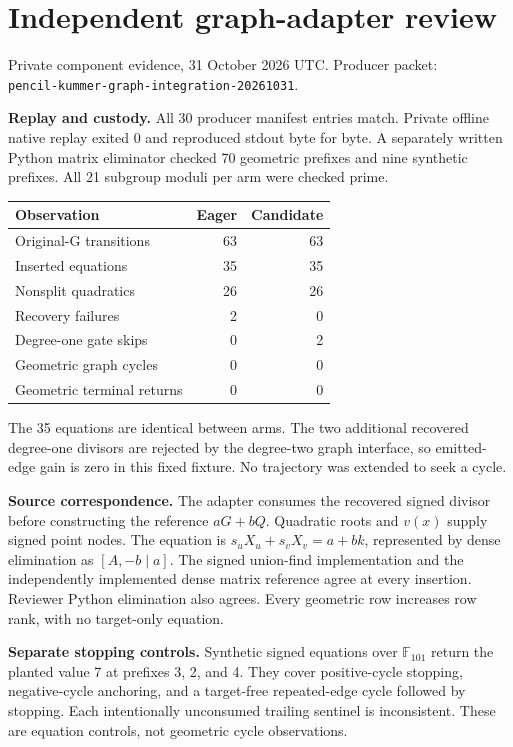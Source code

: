 \documentclass[11pt]{article}
\begin{document}
\section*{Independent graph-adapter review}
Private component evidence, 31 October 2026 UTC. Producer packet:\\ \texttt{pencil-kummer-graph-integration-20261031}.

\textbf{Replay and custody.} All 30 producer manifest entries match. Private offline native replay exited 0 and reproduced stdout byte for byte. A separately written Python matrix eliminator checked 70 geometric prefixes and nine synthetic prefixes. All 21 subgroup moduli per arm were checked prime.

\begin{center}\begin{tabular}{lrr}\toprule
Observation & Eager & Candidate\\\midrule
Original-G transitions &63&63\\
Inserted equations &35&35\\
Nonsplit quadratics &26&26\\
Recovery failures &2&0\\
Degree-one gate skips &0&2\\
Geometric graph cycles &0&0\\
Geometric terminal returns &0&0\\\bottomrule
\end{tabular}\end{center}

The 35 equations are identical between arms. The two additional recovered degree-one divisors are rejected by the degree-two graph interface, so emitted-edge gain is zero in this fixed fixture. No trajectory was extended to seek a cycle.

\textbf{Source correspondence.} The adapter consumes the recovered signed divisor before constructing the reference $aG+bQ$. Quadratic roots and $v(x)$ supply signed point nodes. The equation is $s_u X_u+s_v X_v=a+bk$, represented by dense elimination as $[A,-b\mid a]$. The signed union-find implementation and the independently implemented dense matrix reference agree at every insertion. Reviewer Python elimination also agrees. Every geometric row increases row rank, with no target-only equation.

\textbf{Separate stopping controls.} Synthetic signed equations over $\mathbb F_{101}$ return the planted value 7 at prefixes 3, 2, and 4. They cover positive-cycle stopping, negative-cycle anchoring, and a target-free repeated-edge cycle followed by stopping. Each intentionally unconsumed trailing sentinel is inconsistent. These are equation controls, not geometric cycle observations.
\end{document}
